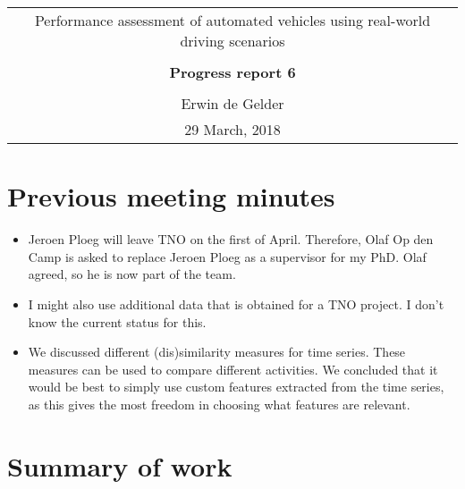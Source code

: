 \documentclass[10pt,final,a4paper,oneside,onecolumn]{article}
\newcommand{\progressreportnumber}{6}
\renewcommand{\author}{Erwin de Gelder}
\renewcommand{\date}{29 March, 2018}
\renewcommand{\title}{Performance assessment of automated vehicles using real-world driving scenarios}
\begin{document}
	
\begin{center}
	\begin{tabular}{c}
		\title \\ \\
		\textbf{\huge Progress report \progressreportnumber} \\ \\
		\author \\ 
		\date
	\end{tabular}
\end{center}

\section{Previous meeting minutes}

\begin{itemize}
	\item Jeroen Ploeg will leave TNO on the first of April. Therefore, Olaf Op den Camp is asked to replace Jeroen Ploeg as a supervisor for my PhD. Olaf agreed, so he is now part of the team.
	\item I might also use additional data that is obtained for a TNO project. I don't know the current status for this.
	\item We discussed different (dis)similarity measures for time series. These measures can be used to compare different activities. We concluded that it would be best to simply use custom features extracted from the time series, as this gives the most freedom in choosing what features are relevant.
\end{itemize}

\section{Summary of work}
\end{document}
